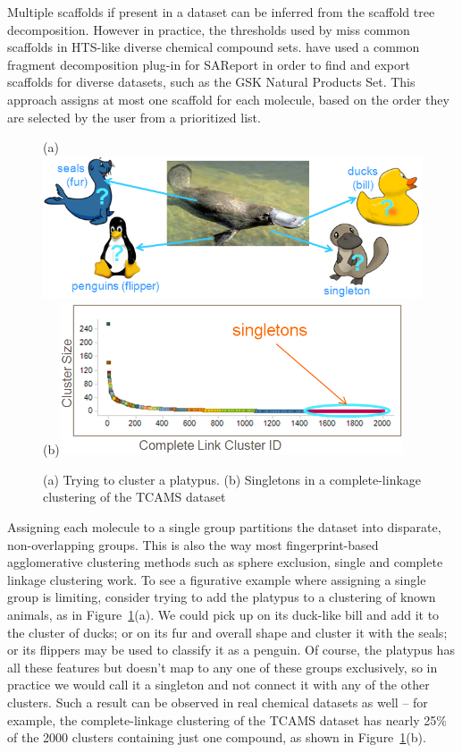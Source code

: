 \documentclass[journal=jacsat,manuscript=article]{achemso}
\newcommand*\fref[1]{Figure~\ref{fig:#1}}
\begin{document}
Multiple scaffolds if present in a dataset can be inferred from the scaffold
tree decomposition\cite{ClarkLabute2008SAReport}. However in practice, the
thresholds used by \citeauthor{ClarkLabute2008SAReport} miss common scaffolds in
HTS-like diverse chemical compound sets. \citeauthor{Bandyopadhyay2011ACS} have
used a common fragment decomposition plug-in for SAReport in order to find and
export scaffolds for diverse datasets, such as the GSK Natural Products Set\cite{Coma2014}.  This approach assigns at most one scaffold for each molecule, based on the order they are selected by the user from a prioritized list.   

\begin{figure}
(a)\includegraphics[width=5.5in]{fig/platypus.png}\\
(b)\includegraphics[width=4in]{fig/singletons.png}
\caption{(a) Trying to cluster a platypus. (b) Singletons in a complete-linkage clustering of the TCAMS dataset }
\label{fig:platypus}
\end{figure}

Assigning each molecule to a single group partitions the dataset into disparate, non-overlapping groups.  This is also the way most fingerprint-based agglomerative clustering methods such as sphere exclusion, single and complete linkage clustering work\cite{Downs2003}. To see a figurative example where assigning a single group is limiting, consider trying to add the platypus to a clustering of known animals, as in \fref{platypus}(a). We could pick up on its duck-like bill and add it to the cluster of ducks; or on its fur and overall shape and cluster it with the seals; or its flippers may be used to classify it as a penguin. Of course, the platypus has all these features but doesn't map to any one of these groups exclusively, so in practice we would call it a singleton and not connect it with any of the other clusters. Such a result can be observed in real chemical datasets as well -- for example, the complete-linkage clustering of the TCAMS dataset\cite{Gamo2010,Calderon2011} has nearly 25\% of the 2000 clusters containing just one compound, as shown in \fref{platypus}(b).        
\end{document}
